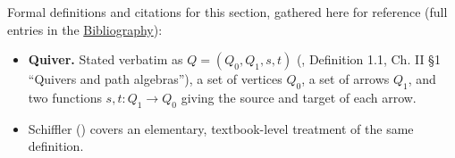 Formal definitions and citations for this section, gathered here for reference (full entries in the \hyperref[sec:root:bibliography:1]{Bibliography}):

\begin{itemize}
\tightlist
\item
  \textbf{Quiver.} Stated verbatim as \(Q = (Q_0, Q_1, s, t)\) (\cite{AssemSimsonSkowronski2006}, Definition 1.1, Ch. II §1 ``Quivers and path algebras''), a set of vertices \(Q_0\), a set of arrows \(Q_1\), and two functions \(s, t : Q_1 \to Q_0\) giving the source and target of each arrow.
\item
  Schiffler (\cite{Schiffler2014}) covers an elementary, textbook-level treatment of the same definition.
\end{itemize}

